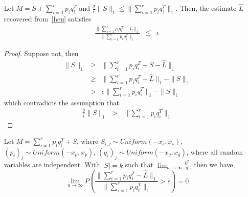\begin{prop}
Let $M=S+\sum_{i=1}^{r}p_{i}q_{i}^{T}$ and $\frac{2}{\epsilon}\|S\|_{1}\le\|\sum_{i=1}^{r}p_{i}q_{i}^{T}\|_{1}$. Then, the estimate $\hat{L}$ recovered from~\eqref{heu} satisfies
\begin{eqnarray*}
\frac{\|\sum_{i=1}^{r}p_{i}q_{i}^{T}-\hat{L}\|_{1}}{\|\sum_{i=1}^{r}p_{i}q_{i}^{T}\|_{1}} & \le & \epsilon
\end{eqnarray*}
\end{prop}
\begin{proof}
Suppose not, then
\begin{eqnarray*}
\|S\|_{1} & \ge & \|\sum_{i=1}^{r}p_{i}q_{i}^{T}+S-\hat{L}\|_{1}\\
 & \ge & \|\sum_{i=1}^{r}p_{i}q_{i}^{T}-\hat{L}\|_{1}-\|S\|_{1}\\
 & > & \epsilon\|\sum_{i=1}^{r}p_{i}q_{i}^{T}\|_{1}-\|S\|_{1}
\end{eqnarray*}
which contradicts the assumption that
\begin{eqnarray*}
\frac{2}{\epsilon}\|S\|_{1} & > & \|\sum_{i=1}^{r}p_{i}q_{i}^{T}\|_1
\end{eqnarray*}
\end{proof}

\begin{prop}
Let $M=\sum_{i=1}^{r}p_{i}q_{i}^{T}+S$, where $S_{i,j}\sim Uniform(-x_{s},x_{s})$,
$(p_{i})_{j}\sim Uniform(-x_{p},x_{p})$, $(q_{i})_{j}\sim Uniform(-x_{q},x_{q})$, where all random variables are independent. With $|S|=k$ such that
$\lim_{n\to\infty}\frac{k^{2}}{n}$, then we have,
\[
\lim_{n \to \infty} P \left( \frac{ \|\sum_{i=1}^{r} p_{i} q_{i}^{T} - \hat{L} \|_{1} }{ \| \sum_{i=1}^{r} p_{i} q_{i}^{T} \|_{1} } > \epsilon \right) = 0
\]
\end{prop}

